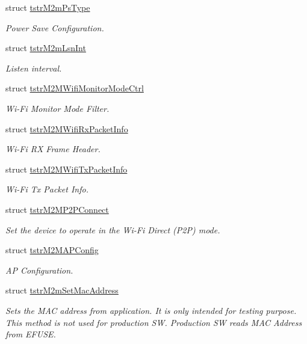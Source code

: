 \begin{DoxyCompactItemize}
struct \hyperlink{structtstrM2mPsType}{tstr\+M2m\+Ps\+Type}
\begin{DoxyCompactList}\small\item\em Power Save Configuration. \end{DoxyCompactList}\item 
struct \hyperlink{structtstrM2mLsnInt}{tstr\+M2m\+Lsn\+Int}
\begin{DoxyCompactList}\small\item\em Listen interval. \end{DoxyCompactList}\item 
struct \hyperlink{structtstrM2MWifiMonitorModeCtrl}{tstr\+M2\+M\+Wifi\+Monitor\+Mode\+Ctrl}
\begin{DoxyCompactList}\small\item\em Wi-\/\+Fi Monitor Mode Filter. \end{DoxyCompactList}\item 
struct \hyperlink{structtstrM2MWifiRxPacketInfo}{tstr\+M2\+M\+Wifi\+Rx\+Packet\+Info}
\begin{DoxyCompactList}\small\item\em Wi-\/\+Fi RX Frame Header. \end{DoxyCompactList}\item 
struct \hyperlink{structtstrM2MWifiTxPacketInfo}{tstr\+M2\+M\+Wifi\+Tx\+Packet\+Info}
\begin{DoxyCompactList}\small\item\em Wi-\/\+Fi Tx Packet Info. \end{DoxyCompactList}\item 
struct \hyperlink{structtstrM2MP2PConnect}{tstr\+M2\+M\+P2\+P\+Connect}
\begin{DoxyCompactList}\small\item\em Set the device to operate in the Wi-\/\+Fi Direct (P2P) mode. \end{DoxyCompactList}\item 
struct \hyperlink{structtstrM2MAPConfig}{tstr\+M2\+M\+A\+P\+Config}
\begin{DoxyCompactList}\small\item\em AP Configuration. \end{DoxyCompactList}\item 
struct \hyperlink{structtstrM2mSetMacAddress}{tstr\+M2m\+Set\+Mac\+Address}
\begin{DoxyCompactList}\small\item\em Sets the M\+AC address from application. It is only intended for testing purpose. This method is not used for production SW. Production SW reads M\+AC Address from E\+F\+U\+SE. \end{DoxyCompactList}\item 

\end{DoxyCompactItemize}
